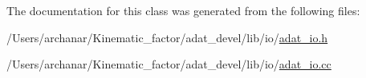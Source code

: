 The documentation for this class was generated from the following files\+:\begin{DoxyCompactItemize}
\item 
/\+Users/archanar/\+Kinematic\+\_\+factor/adat\+\_\+devel/lib/io/\mbox{\hyperlink{lib_2io_2adat__io_8h}{adat\+\_\+io.\+h}}\item 
/\+Users/archanar/\+Kinematic\+\_\+factor/adat\+\_\+devel/lib/io/\mbox{\hyperlink{adat__io_8cc}{adat\+\_\+io.\+cc}}\end{DoxyCompactItemize}
